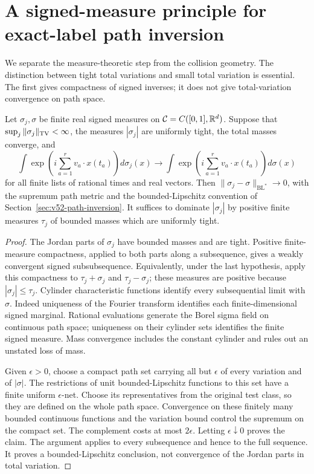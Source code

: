 \section{A signed-measure principle for exact-label path inversion}
\label{sec:v53-signed-transfer}
We separate the measure-theoretic step from the collision geometry.
The distinction between tight total variations and small total variation
is essential. The first gives compactness of signed inverses; it does
not give total-variation convergence on path space.

\begin{lemma}
\label{lem:v53-signed-compactness}
Let $\sigma_j,\sigma$ be finite real signed measures on
$\mathcal C=C([0,1],\mathbb R^d)$. Suppose that
$\sup_j\|\sigma_j\|_{\operatorname{TV}}<\infty$, the measures $|\sigma_j|$ are
uniformly tight, the total masses converge, and
\[
 \int \exp\!\left(i\sum_{a=1}^r v_a\cdot x(t_a)\right)d\sigma_j(x)
 \longrightarrow
 \int \exp\!\left(i\sum_{a=1}^r v_a\cdot x(t_a)\right)d\sigma(x)
\]
for all finite lists of rational times and real vectors. Then
$\|\sigma_j-\sigma\|_{\mathrm{BL}^*}\to0$, with the supremum path
metric and the bounded-Lipschitz convention of
Section~\ref{sec:v52-path-inversion}.
It suffices to dominate $|\sigma_j|$ by positive finite measures
$\tau_j$ of bounded masses which are uniformly tight.
\end{lemma}
\begin{proof}
The Jordan parts of $\sigma_j$ have bounded masses and are tight.
Positive finite-measure compactness, applied to both parts along a
subsequence, gives a weakly convergent signed subsubsequence.
Equivalently, under the last hypothesis, apply this compactness to
$\tau_j+\sigma_j$ and $\tau_j-\sigma_j$; these measures are positive
because $|\sigma_j|\le\tau_j$. Cylinder characteristic functions
identify every subsequential limit with $\sigma$. Indeed uniqueness
of the Fourier transform identifies each finite-dimensional signed
marginal. Rational evaluations generate the Borel sigma field on
continuous path space; uniqueness on their cylinder sets identifies
the finite signed measure. Mass convergence includes the constant
cylinder and rules out an unstated loss of mass.

Given $\epsilon>0$, choose a compact path set carrying all but
$\epsilon$ of every variation and of $|\sigma|$. The restrictions of
unit bounded-Lipschitz functions to this set have a finite uniform
$\epsilon$-net. Choose its representatives from the original test
class, so they are defined on the whole path space. Convergence on
these finitely many bounded continuous functions and the variation
bound control the supremum on the compact set. The complement costs
at most $2\epsilon$. Letting $\epsilon\downarrow0$ proves the claim.
The argument applies to every subsequence and hence to the full
sequence. It proves a bounded-Lipschitz conclusion, not convergence
of the Jordan parts in total variation.
\end{proof}

